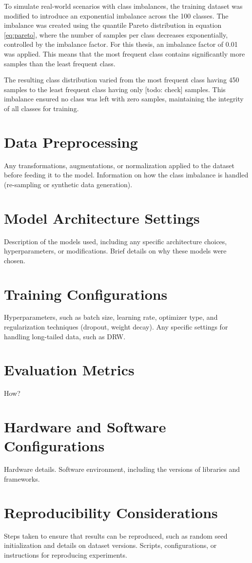 To simulate real-world scenarios with class imbalances, the training dataset was modified to introduce an exponential imbalance across the 100 classes. The imbalance was created using the quantile Pareto distribution in equation \eqref{eq:pareto}, where the number of samples per class decreases exponentially, controlled by the imbalance factor. For this thesis, an imbalance factor of 0.01 was applied. This means that the most frequent class contains significantly more samples than the least frequent class. 

The resulting class distribution varied from the most frequent class having 450 samples to the least frequent class having only [todo: check] samples.  This imbalance ensured no class was left with zero samples, maintaining the integrity of all classes for training.

\section{Data Preprocessing}
Any transformations, augmentations, or normalization applied to the dataset before feeding it to the model.
Information on how the class imbalance is handled (re-sampling or synthetic data generation).

\section{Model Architecture Settings}
Description of the models used, including any specific architecture choices, hyperparameters, or modifications.
Brief details on why these models were chosen.

\section{Training Configurations}
Hyperparameters, such as batch size, learning rate, optimizer type, and regularization techniques (dropout, weight decay).
Any specific settings for handling long-tailed data, such as DRW.

\section{Evaluation Metrics}
How?

\section{Hardware and Software Configurations}
Hardware details.
Software environment, including the versions of libraries and frameworks.

\section{Reproducibility Considerations}
Steps taken to ensure that results can be reproduced, such as random seed initialization and details on dataset versions.
Scripts, configurations, or instructions for reproducing experiments.
